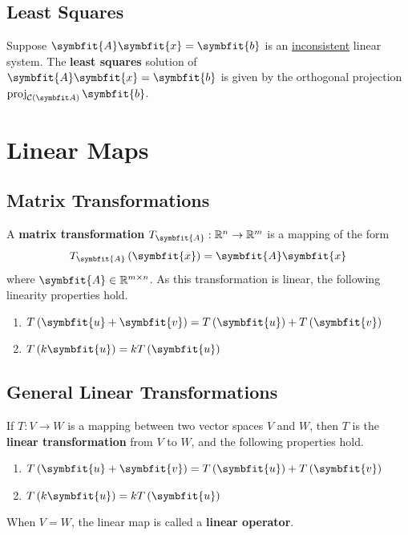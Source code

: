\documentclass{article}
\begin{document}
	\subsection{Least Squares}
	\begin{theorem}
		Suppose $\symbfit{A}\symbfit{x}=\symbfit{b}$ is an \underline{inconsistent} linear system. The \textbf{least squares} solution of $\symbfit{A}\symbfit{x}=\symbfit{b}$ is given by the orthogonal projection $\proj_{\columnspace{A}}\symbfit{b}$.
	\end{theorem}
	\newpage
\section{Linear Maps}
	\subsection{Matrix Transformations}
	\begin{definition}
		A \textbf{matrix transformation} $T_{\symbfit{A}}:\mathbb{R}^n\rightarrow \mathbb{R}^m$ is a mapping of the form
		\begin{equation*}
			\func{T_{\symbfit{A}}}{\symbfit{x}} = \symbfit{A}\symbfit{x}
		\end{equation*}
		where $\symbfit{A}\in \mathbb{R}^{m \times n}$. As this transformation is linear, the following linearity properties hold.
		\begin{enumerate}
			\item $\func{T}{\symbfit{u}+\symbfit{v}}=\func{T}{\symbfit{u}} + \func{T}{\symbfit{v}}$
			\item $\func{T}{k\symbfit{u}}= k\func{T}{\symbfit{u}}$
		\end{enumerate}
	\end{definition}
	\subsection{General Linear Transformations}
	\begin{theorem}
		If $T: V \rightarrow W$ is a mapping between two vector spaces $V$ and $W$, then $T$ is the \textbf{linear transformation} from $V$ to $W$, and the following properties hold.
		\begin{enumerate}
			\item $\func{T}{\symbfit{u}+\symbfit{v}}=\func{T}{\symbfit{u}} + \func{T}{\symbfit{v}}$
			\item $\func{T}{k\symbfit{u}}= k\func{T}{\symbfit{u}}$
		\end{enumerate}
	\end{theorem}
	\begin{theorem}
		When $V=W$, the linear map is called a \textbf{linear operator}.
	\end{theorem}
\end{document}
